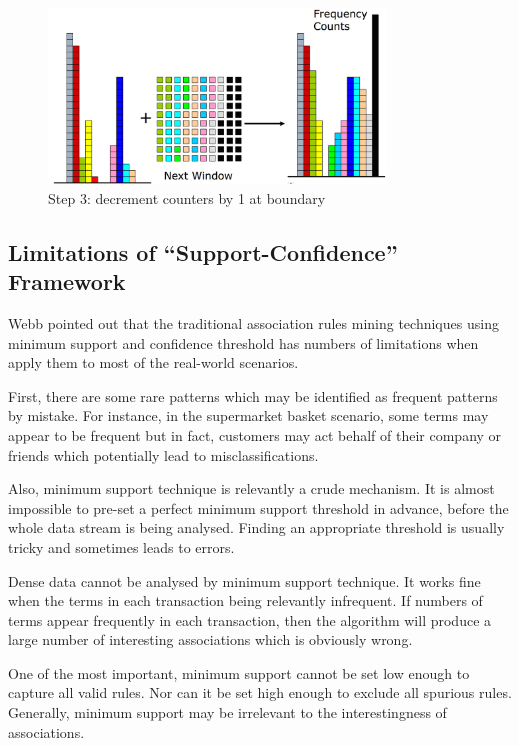 \begin{figure}[H]
    \centering
    \includegraphics[width=0.8\textwidth]{RelatedWorks/lossy3.png}
    \caption{Step 3: decrement counters by 1 at boundary}
    \label{fig:lossy3}
\end{figure}



\subsection{Limitations of ``Support-Confidence” Framework}

Webb \cite{topk} pointed out that the traditional association rules mining techniques using minimum support and confidence threshold has numbers of limitations when apply them to most of the real-world scenarios.

First, there are some rare patterns which may be identified as frequent patterns by mistake. For instance, in the supermarket basket scenario, some terms may appear to be frequent but in fact, customers may act behalf of their company or friends which potentially lead to misclassifications.

Also, minimum support technique is relevantly a crude mechanism. It is almost impossible to pre-set a perfect minimum support threshold in advance, before the whole data stream is being analysed. Finding an appropriate threshold is usually tricky and sometimes leads to errors.

Dense data cannot be analysed by minimum support technique. It works fine when the terms in each transaction being relevantly infrequent. If numbers of terms appear frequently in each transaction, then the algorithm will produce a large number of interesting associations which is obviously wrong.

One of the most important, minimum support cannot be set low enough to
capture all valid rules. Nor can it be set high enough to exclude all spurious rules. Generally, minimum support may be irrelevant to the interestingness of associations.

